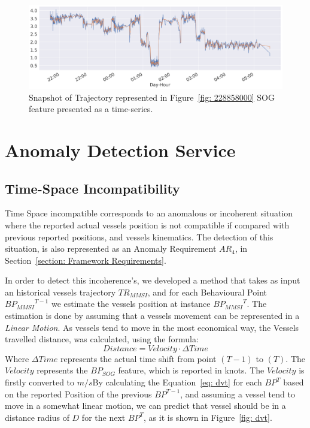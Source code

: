 \begin{figure}[H]
\centering
\includegraphics[width=\textwidth]{figures/Ch3/ts_smoothed.png}
\caption{Snapshot of Trajectory represented in Figure~\ref{fig: 228858000} SOG feature presented as a time-series.}
\label{fig: 228858000 ts smoothed}
\end{figure}

\section{Anomaly Detection Service}
\subsection{Time-Space Incompatibility}
\label{subsection: 4 Time-Space Incompatibility}
Time Space incompatible corresponds to an anomalous or incoherent situation where the reported actual vessels position is not compatible if compared with previous reported positions, and vessels kinematics. The detection of this situation, is also represented as an Anomaly Requirement \emph{$AR_4$}, in Section~\ref{section: Framework Requirements}.

In order to detect this incoherence's, we developed a method that takes as input an historical vessels trajectory $TR_{MMSI}$, and for each Behavioural Point ${BP_{MMSI}}^{T-1}$ we estimate the vessels position at instance ${BP_{MMSI}}^{T}$.
The estimation is done by assuming that a vessels movement can be represented in a \emph{Linear Motion}. As vessels tend to move in the most economical way, the Vessels travelled distance, was calculated, using the formula:
\begin{equation}
Distance = Velocity \cdot \Delta Time
\label{eq: dvt}
\end{equation}
Where $\Delta Time$ represents the actual time shift from point $(T-1)$ to $(T)$. The $Velocity$ represents the $BP_{SOG}$ feature, which is reported in knots. The $Velocity$ is firstly converted to $m/s$By calculating the Equation~\ref{eq: dvt} for each $BP^{T}$ based on the reported Position of the previous $BP^{T-1}$, and assuming a vessel tend to move in a somewhat linear motion, we can predict that vessel should be in a distance radius of $D$ for the next $BP^T$, as it is shown in Figure~\ref{fig: dvt}.

